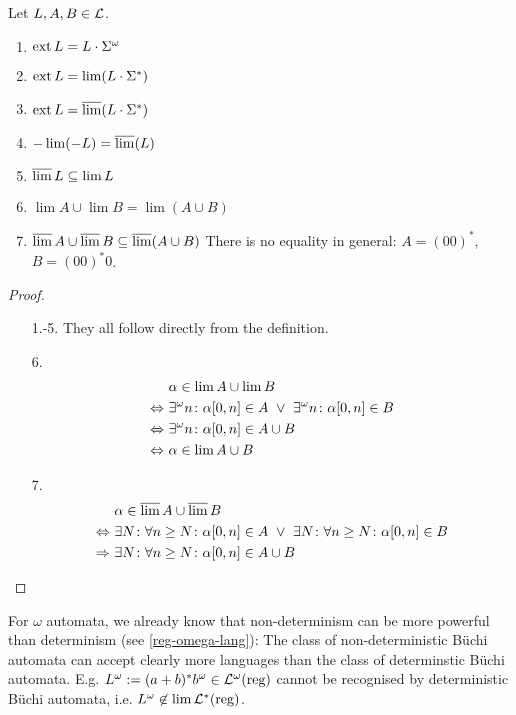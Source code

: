\begin{lemma}
\label{gen:general}
Let $L,A,B \in \mathcal{L}$.
\begin{enumerate}
\item $\operatorname{ext} L = L \cdot \Sigma^\omega$
\item $\operatorname{ext} L = \lim(L \cdot \Sigma^*)$ %
\item $\operatorname{ext} L = \operatorname{\overline{lim}}(L \cdot \Sigma^*)$ %
\item $- \lim(-L) = \operatorname{\overline{lim}}(L)$
\item $\operatorname{\overline{lim}} L \subseteq \lim L$
\item $\lim A \cup \lim B = \lim(A \cup B)$ %
\item $\operatorname{\overline{lim}} A \cup \operatorname{\overline{lim}} B \subseteq \operatorname{\overline{lim}}(A \cup B)$ \newline %
There is no equality in general: $A = (00)^*$, $B = (00)^*0$.
\end{enumerate}
\begin{proof}
\begin{enumerate}
\item[1.-5.] They all follow directly from the definition.
\item[6.] %
\begin{align*}
& \alpha \in \lim A \cup \lim B \\
\Leftrightarrow \ & \existsinf n \colon \alpha[0,n] \in A \ \vee \ \existsinf n \colon \alpha[0,n] \in B \\
\Leftrightarrow \ & \existsinf n \colon \alpha[0,n] \in A \cup B \\
\Leftrightarrow \ & \alpha \in \lim A \cup B
\end{align*}
\item[7.] %
\begin{align*}
& \alpha \in \dlim A \cup \dlim B \\
\Leftrightarrow \ & \exists N \colon \forall n \ge N \colon \alpha[0,n] \in A \ \vee \ 
\exists N \colon \forall n \ge N \colon \alpha[0,n] \in B \\
\Rightarrow \ & \exists N \colon \forall n \ge N \colon \alpha[0,n] \in A \cup B
\end{align*}
\end{enumerate}
\end{proof}
\end{lemma}

For $\omega$ automata, we already know that non-determinism can be more powerful than determinism (see \cref{reg-omega-lang}): The class of non-deterministic Büchi automata can accept clearly more languages than the class of determinstic Büchi automata. E.g. $L^\omega := (a+b)^* b^\omega \in \mathcal{L}^\omega(\text{reg})$ cannot be recognised by deterministic Büchi automata, i.e. $L^\omega \not\in \lim \mathcal{L}^*(\text{reg})$.

